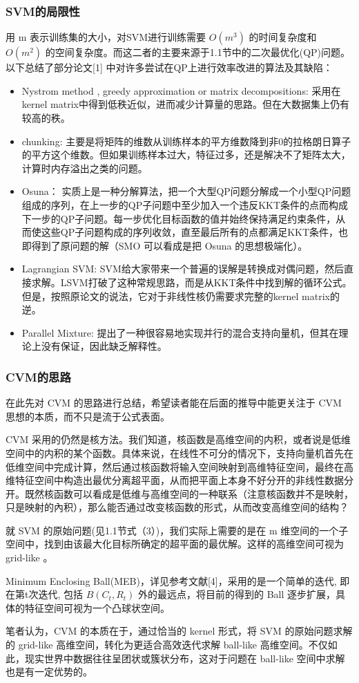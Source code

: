 \documentclass[UTF8, fleqn,10pt]{SelfArx} %
\begin{document}
		\subsubsection{SVM的局限性}
		用 m 表示训练集的大小，对SVM进行训练需要 $O(m^3)$ 的时间复杂度和 $O(m^2)$ 的空间复杂度。而这二者的主要来源于1.1节中的二次最优化(QP)问题。以下总结了部分论文[1] 中对许多尝试在QP上进行效率改进的算法及其缺陷：
		\begin{itemize}
			\item Nystrom method , greedy approximation 
			or matrix decompositions: 采用在kernel matrix中得到低秩近似，进而减少计算量的思路。但在大数据集上仍有较高的秩。
			\item chunking: 主要是将矩阵的维数从训练样本的平方维数降到非0的拉格朗日算子的平方这个维数。但如果训练样本过大，特征过多，还是解决不了矩阵太大，计算时内存溢出之类的问题。
			\item  Osuna：
			实质上是一种分解算法，把一个大型QP问题分解成一个小型QP问题组成的序列，在上一步的QP子问题中至少加入一个违反KKT条件的点而构成下一步的QP子问题。每一步优化目标函数的值并始终保持满足约束条件，从而使这些QP子问题构成的序列收敛，直至最后所有的点都满足KKT条件，也即得到了原问题的解（SMO 可以看成是把 Osuna 的思想极端化）。
			\item Lagrangian SVM: SVM给大家带来一个普遍的误解是转换成对偶问题，然后直接求解。LSVM打破了这种常规思路，而是从KKT条件中找到解的循环公式。但是，按照原论文的说法，它对于非线性核仍需要求完整的kernel matrix的逆。
			\item Parallel Mixture: 提出了一种很容易地实现并行的混合支持向量机，但其在理论上没有保证，因此缺乏解释性。
		\end{itemize}
		\subsubsection{CVM的思路}
			在此先对 CVM 的思路进行总结，希望读者能在后面的推导中能更关注于 CVM 思想的本质，而不只是流于公式表面。\par
			CVM 采用的仍然是核方法。我们知道，核函数是高维空间的内积，或者说是低维空间中的内积的某个函数。具体来说，在线性不可分的情况下，支持向量机首先在低维空间中完成计算，然后通过核函数将输入空间映射到高维特征空间，最终在高维特征空间中构造出最优分离超平面，从而把平面上本身不好分开的非线性数据分开。既然核函数可以看成是低维与高维空间的一种联系（注意核函数并不是映射，只是映射的內积），那么能否通过改变核函数的形式，从而改变高维空间的结构？\par
			就 SVM 的原始问题(见1.1节式（3）)，我们实际上需要的是在 m 维空间的一个子空间中，找到由该最大化目标所确定的超平面的最优解。这样的高维空间可视为 grid-like 。\par
			Minimum
			Enclosing Ball(MEB)，详见参考文献[4]，采用的是一个简单的迭代, 即在第t次迭代, 包括 $B(C_t, R_t)$ 外的最远点，将目前的得到的 Ball 逐步扩展，具体的特征空间可视为一个凸球状空间。\par
			笔者认为，CVM 的本质在于，通过恰当的 kernel 形式，将 SVM 的原始问题求解的 grid-like 高维空间，转化为更适合高效迭代求解 ball-like 高维空间。不仅如此，现实世界中数据往往呈团状或簇状分布，这对于问题在 ball-like 空间中求解也是有一定优势的。
\end{document}
